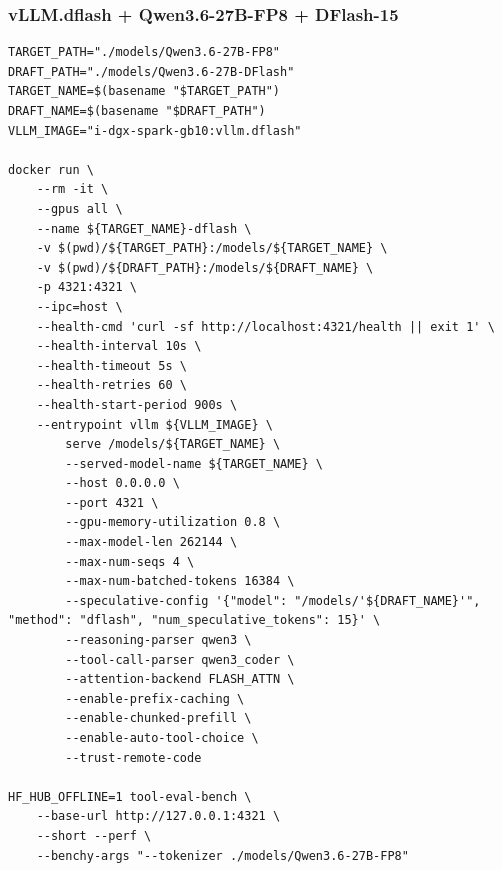 \documentclass{article}
\begin{document}
\subsubsection{vLLM.dflash + Qwen3.6-27B-FP8 + DFlash-15}
\begin{lstlisting}
TARGET_PATH="./models/Qwen3.6-27B-FP8"
DRAFT_PATH="./models/Qwen3.6-27B-DFlash"
TARGET_NAME=$(basename "$TARGET_PATH")
DRAFT_NAME=$(basename "$DRAFT_PATH")
VLLM_IMAGE="i-dgx-spark-gb10:vllm.dflash"

docker run \
    --rm -it \
    --gpus all \
    --name ${TARGET_NAME}-dflash \
    -v $(pwd)/${TARGET_PATH}:/models/${TARGET_NAME} \
    -v $(pwd)/${DRAFT_PATH}:/models/${DRAFT_NAME} \
    -p 4321:4321 \
    --ipc=host \
    --health-cmd 'curl -sf http://localhost:4321/health || exit 1' \
    --health-interval 10s \
    --health-timeout 5s \
    --health-retries 60 \
    --health-start-period 900s \
    --entrypoint vllm ${VLLM_IMAGE} \
        serve /models/${TARGET_NAME} \
        --served-model-name ${TARGET_NAME} \
        --host 0.0.0.0 \
        --port 4321 \
        --gpu-memory-utilization 0.8 \
        --max-model-len 262144 \
        --max-num-seqs 4 \
        --max-num-batched-tokens 16384 \
        --speculative-config '{"model": "/models/'${DRAFT_NAME}'", "method": "dflash", "num_speculative_tokens": 15}' \
        --reasoning-parser qwen3 \
        --tool-call-parser qwen3_coder \
        --attention-backend FLASH_ATTN \
        --enable-prefix-caching \
        --enable-chunked-prefill \
        --enable-auto-tool-choice \
        --trust-remote-code

HF_HUB_OFFLINE=1 tool-eval-bench \
    --base-url http://127.0.0.1:4321 \
    --short --perf \
    --benchy-args "--tokenizer ./models/Qwen3.6-27B-FP8"
\end{lstlisting}
\end{document}
